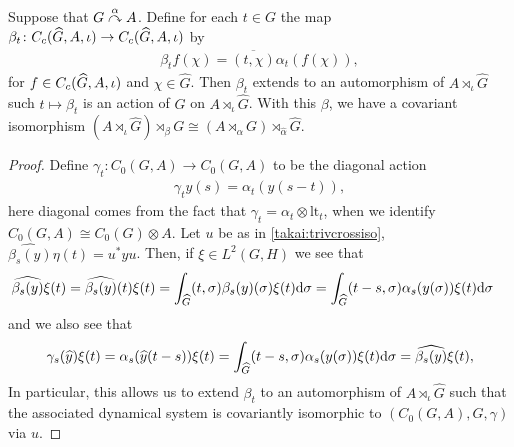 \begin{proposition}
	Suppose that $G \stackrel{\alpha}{\curvearrowright} A$. Define for each $t \in G$ the map $\beta_t \colon C_c( \widehat{G}, A, \iota) \to C_c(\widehat{G}, A, \iota)$ by
	\begin{align*}
		\beta_t f(\chi) = \overline{ ( t, \chi)} \alpha_t(f(\chi)),	
	\end{align*}
	for $f \in C_c(\widehat{G}, A, \iota)$ and $\chi \in \hat G$. Then $\beta_t$ extends to an automorphism of $A \rtimes_{\iota} \hat G$ such $t \mapsto \beta_t$ is an action of $G$ on $A \rtimes_\iota \hat G$. With this $\beta$, we have a covariant isomorphism $(A \rtimes_\iota \hat G) \rtimes_\beta G \cong (A \rtimes_\alpha G) \rtimes_{\hat \alpha} \hat G$. 
\end{proposition}
\begin{proof}
Define $\gamma_t \colon C_0(G,A) \to C_0(G,A)$ to be the diagonal action
\begin{align*}
	\gamma_t y(s) = \alpha_t (y(s-t)),
\end{align*}
here diagonal comes from the fact that $\gamma_t = \alpha_t \otimes \mathrm{lt}_t$, when we identify $C_0(G,A) \cong C_0(G) \otimes A$. Let $u$ be as in \cref{takai:trivcrossiso}, $\hat{\beta_s(y)} \eta(t) = u^*yu$. Then, if $\xi \in L^2(G,H)$ we see that
\begin{align*}
	\widehat{\beta_s(y)}\xi(t) = \widehat{\beta_s(y)}(t) \xi(t) = \int_{\widehat{G}} (t, \sigma) \beta_s(y)(\sigma) \xi(t) \mathrm{d} \sigma &= \int_{\widehat{G}} (t-s,\sigma) \alpha_s(y(\sigma)) \xi(t) \mathrm{d} \sigma
\end{align*}
and we also see that 
\begin{align*}
	\gamma_s (\widehat{y}) \xi(t) = \alpha_{s}(\widehat{y}(t-s)) \xi(t) = \int_{\widehat{G}} (t-s, \sigma) \alpha_s (y (\sigma)) \xi(t) \mathrm{d} \sigma = \widehat{\beta_s(y)} \xi(t),
\end{align*}
In particular, this allows us to extend $\beta_t$ to an automorphism of $A \rtimes_\iota \hat G$ such that the associated dynamical system is covariantly isomorphic to $(C_0(G,A),G,\gamma)$ via $u$.


\end{proof}
